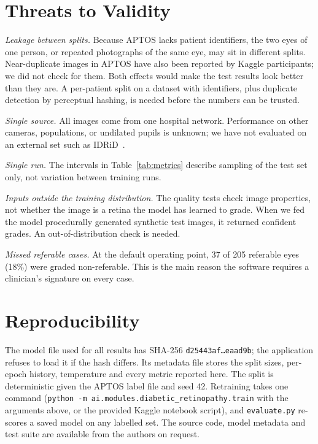 \documentclass[conference]{IEEEtran}
\begin{document}
\section{Threats to Validity}
\label{sec:threats}
\textit{Leakage between splits.} Because APTOS lacks patient identifiers, the two eyes of one person, or repeated
photographs of the same eye, may sit in different splits. Near-duplicate images in APTOS have also been reported by
Kaggle participants; we did not check for them. Both effects would make the test results look better than they are. A per-patient split on a dataset
with identifiers, plus duplicate detection by perceptual hashing, is needed before the numbers can be trusted.

\textit{Single source.} All images come from one hospital network. Performance on other cameras, populations, or
undilated pupils is unknown; we have not evaluated on an external set such as IDRiD~\cite{porwal2018}.

\textit{Single run.} The intervals in Table~\ref{tab:metrics} describe sampling of the test set only, not variation
between training runs.

\textit{Inputs outside the training distribution.} The quality tests check image properties, not whether the image is a
retina the model has learned to grade. When we fed the model procedurally generated synthetic test images, it returned
confident grades. An out-of-distribution check is needed.

\textit{Missed referable cases.} At the default operating point, 37 of 205 referable eyes (18\%) were graded
non-referable. This is the main reason the software requires a clinician's signature on every case.

\section{Reproducibility}
The model file used for all results has SHA-256
\texttt{d25443af\ldots eaad9b}; the application refuses to load it if the hash differs. Its metadata file stores the
split sizes, per-epoch history, temperature and every metric reported here. The split is deterministic given the
APTOS label file and seed 42. Retraining takes one command (\texttt{python -m ai.modules.diabetic\_retinopathy.train}
with the arguments above, or the provided Kaggle notebook script), and \texttt{evaluate.py} re-scores a saved model on
any labelled set. The source code, model metadata and test suite are available from the authors on request.
\end{document}
